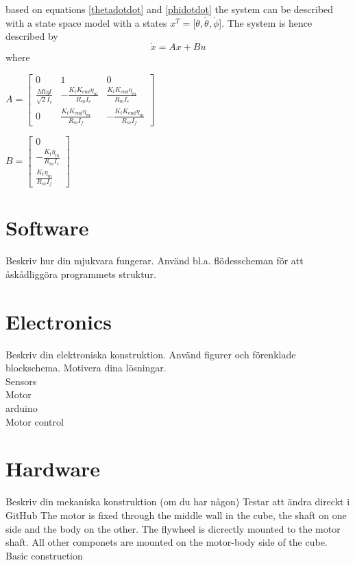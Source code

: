 \documentclass[a4paper,11pt]{kth-mag}
\begin{document}
based on equations \eqref{thetadotdot} and \eqref{phidotdot} the system can be described with a state space model with a states $x^T = [\theta, \dot{\theta}, \dot{\phi}$]. The system is hence described by
\begin{equation}
\dot{x} = Ax + Bu
\end{equation} 
where \\
\begin{center}
$A =\begin{bmatrix}
0 & 1 & 0 \\
\frac{Mt g l }{\sqrt{2} I_c} & - \frac{K_t K_{\text{emf}} \eta_m}{R_m I_c} & \frac{K_t K_{\text{emf}} \eta_m}{R_m I_c} \\ 
0 & \frac{K_t K_{\text{emf}} \eta_m}{R_m I_f} & -\frac{K_t K_{\text{emf}} \eta_m}{R_m I_f}
\end{bmatrix}$

$B = \begin{bmatrix}
0 \\ 
-\frac{K_t \eta_m}{R_m I_c} \\
\frac{K_t \eta_m}{R_m I_f}
\end{bmatrix} $
\end{center}


\section{Software}
Beskriv hur din mjukvara fungerar. Använd bl.a. flödesscheman för att åskådliggöra programmets struktur.

\section{Electronics}
Beskriv din elektroniska konstruktion. Använd figurer och förenklade blockschema. Motivera dina lösningar.
\\ Sensors
\\ Motor
\\ arduino
\\ Motor control


\section{Hardware}
Beskriv din mekaniska konstruktion (om du har någon)
Testar att ändra direckt i GitHub
The motor is fixed through the middle wall in the cube, the shaft on one side and the body on the other. The flywheel is dicrectly mounted to the motor shaft. All other componets are mounted on the motor-body side of the cube.
\\ Basic construction
\end{document}
